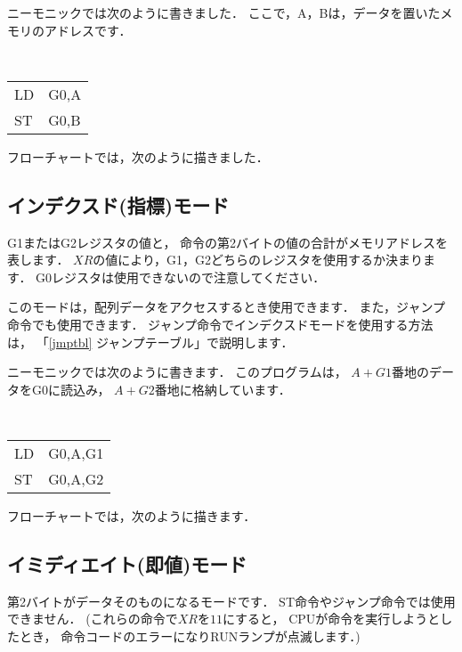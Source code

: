 ニーモニックでは次のように書きました．
ここで，A，Bは，データを置いたメモリのアドレスです．

\begin{center}
{\tt
\begin{tabular}{l l}
LD & G0,A \\
ST & G0,B \\
\end{tabular}
}
\end{center}

フローチャートでは，次のように描きました．

\begin{center}
\epsfxsize=3cm
\end{center}

\subsection{インデクスド(指標)モード}
G1またはG2レジスタの値と，
命令の第2バイトの値の合計がメモリアドレスを表します．
$XR$の値により，G1，G2どちらのレジスタを使用するか決まります．
G0レジスタは使用できないので注意してください．

このモードは，配列データをアクセスするとき使用できます．
また，ジャンプ命令でも使用できます．
ジャンプ命令でインデクスドモードを使用する方法は，
「\ref{jmptbl} ジャンプテーブル」で説明します．

ニーモニックでは次のように書きます．
このプログラムは，
$A+G1$番地のデータをG0に読込み，
$A+G2$番地に格納しています．

\begin{center}
{\tt
\begin{tabular}{l l}
LD & G0,A,G1 \\
ST & G0,A,G2 \\
\end{tabular}
}
\end{center}

フローチャートでは，次のように描きます．

\begin{center}
\epsfxsize=3cm
\end{center}

\subsection{イミディエイト(即値)モード}
第2バイトがデータそのものになるモードです．
ST命令やジャンプ命令では使用できません．
(これらの命令で$XR$を$11$にすると，
CPUが命令を実行しようとしたとき，
命令コードのエラーになりRUNランプが点滅します．)

